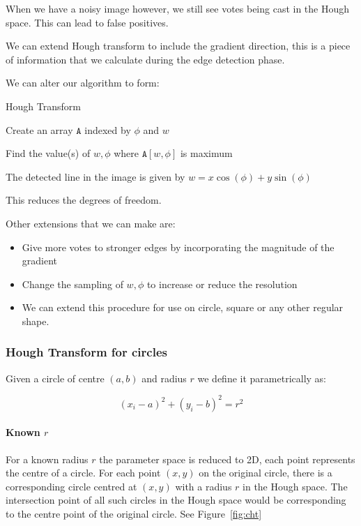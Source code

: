 \documentclass{article}
\begin{document}
When we have a noisy image however, we still see votes being cast in the Hough space. This can lead to false positives.

We can extend Hough transform to include the gradient direction, this is a piece of information that we calculate during the edge detection phase.

We can alter our algorithm to form:

\begin{algorithm}
  \caption{Hough Transform}
  Create an array $\texttt{A} $ indexed by $\phi$ and $w$


  Find the value(s) of $w,\phi$ where $\texttt{A}[w,\phi] $ is maximum

  The detected line in the image is given by $w = x\cos(\phi) + y\sin(\phi)$
\end{algorithm}

This reduces the degrees of freedom.

Other extensions that we can make are:

\begin{itemize}
  \item Give more votes to stronger edges by incorporating the magnitude of the gradient
  \item Change the sampling of $w, \phi$ to increase or reduce the resolution
  \item We can extend this procedure for use on circle, square or any other regular shape.
\end{itemize}

\subsubsection{Hough Transform for circles}

Given a circle of centre $(a,b)$ and radius $r$ we define it parametrically as:

\[
  (x_{i} - a )^{2} + (y_{i} - b)^{2} = r^{2}
\]
\paragraph{Known $r$}
For a known radius $r$ the parameter space is reduced to 2D, each point represents the centre of a circle. For each point $(x,y)$ on the original circle, there is a corresponding circle centred at $(x,y)$ with a radius $r$ in the Hough space. The intersection point of all such circles in the Hough space would be corresponding to the centre point of the original circle. See Figure~\ref{fig:cht}
\end{document}
